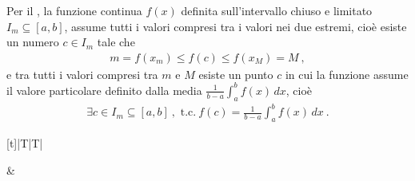 \documentclass[letterpaper,10pt,italian]{jupyterBook}
\begin{document}
\sphinxAtStartPar
Per il {\hyperref[\detokenize{ch/infinitesimal_calculus/analysis:infinitesimal-calculus-continuous-fun-thms-intermediate}]{}}, la funzione continua \(f(x)\) definita sull’intervallo chiuso e limitato \(I_m \subseteq [a,b]\), assume tutti i valori compresi tra i valori nei due estremi, cioè esiste un numero \(c \in I_m\) tale che
\begin{equation*}
\begin{split}m = f(x_m) \le f(c) \le f(x_M) = M \ ,\end{split}
\end{equation*}
\sphinxAtStartPar
e tra tutti i valori compresi tra \(m\) e \(M\) esiste un punto \(c\) in cui la funzione assume il valore particolare definito dalla media \(\frac{1}{b-a}\int_{a}^{b} f(x) \, dx\), cioè
\begin{equation*}
\begin{split}\exists c \in I_m \subseteq [a,b] \ , \text{ t.c.} \ f(c) = \frac{1}{b-a}\int_{a}^{b} f(x) \, dx \ .\end{split}
\end{equation*}



\begin{savenotes}\sphinxattablestart
\centering
\begin{tabulary}{\linewidth}[t]{|T|T|}
\hline

\sphinxAtStartPar
{}
&
\sphinxAtStartPar
{}
\\
\hline
\end{tabulary}
\par
\sphinxattableend\end{savenotes}
\end{document}
